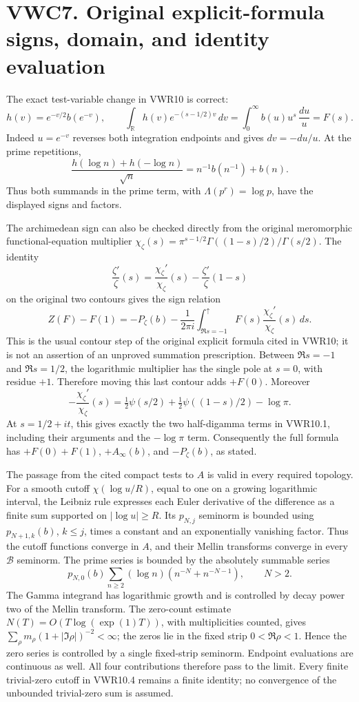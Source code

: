 \section{VWC7. Original explicit-formula signs, domain, and identity
evaluation}\label{vwc7.-original-explicit-formula-signs-domain-and-identity-evaluation}

The exact test-variable change in VWR10 is correct: \[
h(v)=e^{-v/2}b(e^{-v}),\qquad
\int_{\mathbb R}h(v)e^{-(s-1/2)v}\,dv
=\int_0^\infty b(u)u^s\,\frac{du}{u}=F(s).
\] Indeed \(u=e^{-v}\) reverses both integration endpoints and gives
\(dv=-du/u\). At the prime repetitions, \[
\frac{h(\log n)+h(-\log n)}{\sqrt n}
=n^{-1}b(n^{-1})+b(n).
\] Thus both summands in the prime term, with \(\Lambda(p^r)=\log p\),
have the displayed signs and factors.

The archimedean sign can also be checked directly from the original
meromorphic functional-equation multiplier
\(\chi_\zeta(s)=\pi^{s-1/2}\Gamma((1-s)/2)/\Gamma(s/2)\). The identity
\[
\frac{\zeta'}{\zeta}(s)
=\frac{\chi_\zeta'}{\chi_\zeta}(s)
 -\frac{\zeta'}{\zeta}(1-s)
\] on the original two contours gives the sign relation \[
Z(F)-F(1)
=-P_\zeta(b)
 -\frac1{2\pi i}\int_{\Re s=-1}^{\uparrow}
                 F(s)\frac{\chi_\zeta'}{\chi_\zeta}(s)\,ds.
\] This is the usual contour step of the original explicit formula cited
in VWR10; it is not an assertion of an unproved summation prescription.
Between \(\Re s=-1\) and \(\Re s=1/2\), the logarithmic multiplier has
the single pole at \(s=0\), with residue \(+1\). Therefore moving this
last contour adds \(+F(0)\). Moreover \[
-\frac{\chi_\zeta'}{\chi_\zeta}(s)
=\tfrac12\psi(s/2)+\tfrac12\psi((1-s)/2)-\log\pi.
\] At \(s=1/2+it\), this gives exactly the two half-digamma terms in
VWR10.1, including their arguments and the \(-\log\pi\) term.
Consequently the full formula has \(+F(0)+F(1)\), \(+A_\infty(b)\), and
\(-P_\zeta(b)\), as stated.

The passage from the cited compact tests to \(A\) is valid in every
required topology. For a smooth cutoff \(\chi(\log u/R)\), equal to one
on a growing logarithmic interval, the Leibniz rule expresses each Euler
derivative of the difference as a finite sum supported on
\(|\log u|\geq R\). Its \(p_{N,j}\) seminorm is bounded using
\(p_{N+1,k}(b)\), \(k\leq j\), times a constant and an exponentially
vanishing factor. Thus the cutoff functions converge in \(A\), and their
Mellin transforms converge in every \(\mathcal B\) seminorm. The prime
series is bounded by the absolutely summable series \[
p_{N,0}(b)\sum_{n\geq2}(\log n)(n^{-N}+n^{-N-1}),\qquad N>2.
\] The Gamma integrand has logarithmic growth and is controlled by decay
power two of the Mellin transform. The zero-count estimate
\(N(T)=O(T\log(\exp(1)T))\), with multiplicities counted, gives
\(\sum_\rho m_\rho(1+|\Im\rho|)^{-2}<\infty\); the zeros lie in the
fixed strip \(0<\Re\rho<1\). Hence the zero series is controlled by a
single fixed-strip seminorm. Endpoint evaluations are continuous as
well. All four contributions therefore pass to the limit. Every finite
trivial-zero cutoff in VWR10.4 remains a finite identity; no convergence
of the unbounded trivial-zero sum is assumed.

